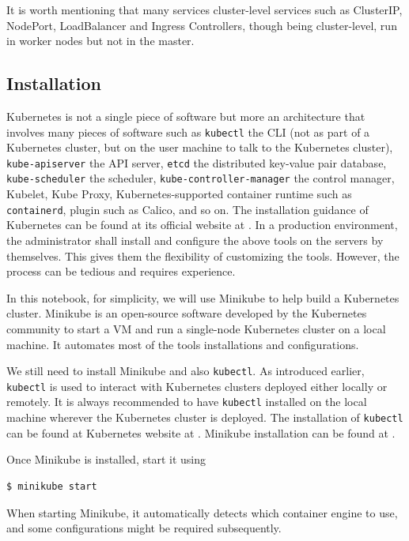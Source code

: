 It is worth mentioning that many services cluster-level services such as ClusterIP, NodePort, LoadBalancer and Ingress Controllers, though being cluster-level, run in worker nodes but not in the master. 

\subsection{Installation}

Kubernetes is not a single piece of software but more an architecture that involves many pieces of software such as \verb|kubectl| the CLI (not as part of a Kubernetes cluster, but on the user machine to talk to the Kubernetes cluster), \verb|kube-apiserver| the API server, \verb|etcd| the distributed key-value pair database, \verb|kube-scheduler| the scheduler, \verb|kube-controller-manager| the control manager, Kubelet, Kube Proxy, Kubernetes-supported container runtime such as \verb|containerd|,  plugin such as Calico, and so on. The installation guidance of Kubernetes can be found at its official website at \cite{kubernetes2026}. In a production environment, the administrator shall install and configure the above tools on the servers by themselves. This gives them the flexibility of customizing the tools. However, the process can be tedious and requires experience.

In this notebook, for simplicity, we will use Minikube to help build a Kubernetes cluster. Minikube is an open-source software developed by the Kubernetes community to start a VM and run a single-node Kubernetes cluster on a local machine. It automates most of the tools installations and configurations. 

We still need to install Minikube and also \verb|kubectl|. As introduced earlier, \verb|kubectl| is used to interact with Kubernetes clusters deployed either locally or remotely. It is always recommended to have \verb|kubectl| installed on the local machine wherever the Kubernetes cluster is deployed. The installation of \verb|kubectl| can be found at Kubernetes website at \cite{kubernetesKubectlLinux2026}. Minikube installation can be found at \cite{minikubeStart2026}.

Once Minikube is installed, start it using
\begin{lstlisting}
$ minikube start
\end{lstlisting}
When starting Minikube, it automatically detects which container engine to use, and some configurations might be required subsequently.

